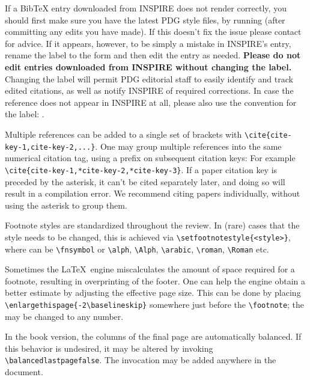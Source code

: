 If a BibTeX entry downloaded from INSPIRE does not render correctly, 
you should first make sure you have the latest PDG style files, by running  (after committing any edits you have made).
If this doesn't fix the issue please contact  for advice.  
If it appears, however, to be simply a mistake in INSPIRE's entry, 
rename the label to the form  and then edit the entry as needed.
\textbf{Please do not edit entries downloaded from INSPIRE without changing the label.}
Changing the label will permit PDG editorial staff to easily identify and track edited citations, as well as notify INSPIRE of required corrections.
In case the reference does not appear in INSPIRE at all, please also use the convention for the label: .

Multiple references can be added to a single set of brackets with \lstinline!\cite{cite-key-1,cite-key-2,...}!.
One may group multiple references into the same numerical citation tag, using a \invt{*} prefix on subsequent citation keys: For example \lstinline!\cite{cite-key-1,*cite-key-2,*cite-key-3}!.
If a paper citation key is preceded by the asterisk, it can't be cited separately later, and doing so will result in a compilation error.
We recommend citing papers individually, without using the asterisk to group them.


Footnote styles are standardized throughout the review. In (rare) cases that the style needs to be changed, this is achieved via \lstinline!\setfootnotestyle{<style>}!,
where  can be \lstinline{\fnsymbol} or \lstinline{\alph}, \lstinline{\Alph}, \lstinline{\arabic}, \lstinline{\roman}, \lstinline{\Roman} etc.

Sometimes the \LaTeX \ engine miscalculates the amount of space required for a footnote, resulting in overprinting of the footer.
One can help the engine obtain a better estimate by adjusting the effective page size. 
This can be done by placing \lstinline!\enlargethispage{-2\baselineskip}! somewhere just before the \lstinline{\footnote}; the  may be changed to any number. 


In the book version, the columns of the final page are automatically balanced. 
If this behavior is undesired, it may be altered by invoking \lstinline!\balancedlastpagefalse!.
The invocation may be added anywhere in the document.

